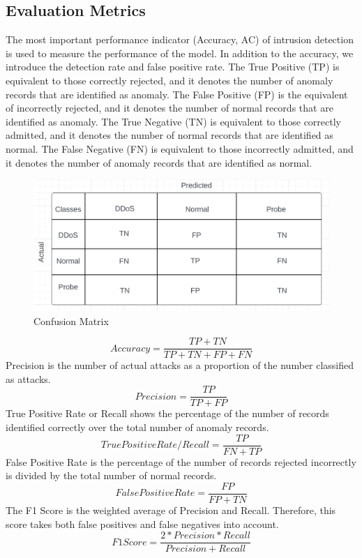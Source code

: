 \subsection{Evaluation Metrics}
\vspace{-18pt}
The most important performance indicator (Accuracy, AC) of intrusion detection is used to measure the performance of the model. In addition to the accuracy, we introduce the detection rate and false positive rate. The True Positive (TP) is equivalent to those correctly rejected, and it denotes the number of anomaly records that are identified as anomaly. The False Positive (FP) is the equivalent of incorrectly rejected, and it denotes the number of normal records that are identified as anomaly. The True Negative (TN) is equivalent to those correctly admitted, and it denotes the number of normal records that are identified as normal. The False Negative (FN) is equivalent to those incorrectly admitted, and it denotes the number of anomaly records that are identified as normal.
\begin{figure}[tbh] %
\begin{center}
	\includegraphics[width=6in]{images/confMat.png} 
	\caption{Confusion Matrix} %
	\label{Confusion Matrix} %
\end{center}
\end{figure}
\begin{equation}
Accuracy = \frac{TP + TN}{TP + TN + FP + FN}
\end{equation} 
Precision is the number of actual attacks as a proportion of the number classified as attacks.
\begin{equation}
Precision = \frac{TP}{TP + FP} 
\end{equation}
True Positive Rate or Recall shows the percentage of the number of records identified correctly over the total number of anomaly records.
\begin{equation}
True Positive Rate/ Recall = \frac{TP}{FN + TP}
\end{equation}
False Positive Rate is the percentage of the number of records rejected incorrectly is divided by the total number of normal records.
\begin{equation}
False Positive Rate = \frac{FP}{FP + TN}
\end{equation}
The F1 Score is the weighted average of Precision and Recall. Therefore, this score takes both false positives and false negatives into account.
\begin{equation}
	F1 Score = \frac{2 * Precision * Recall}{Precision + Recall}
\end{equation}
